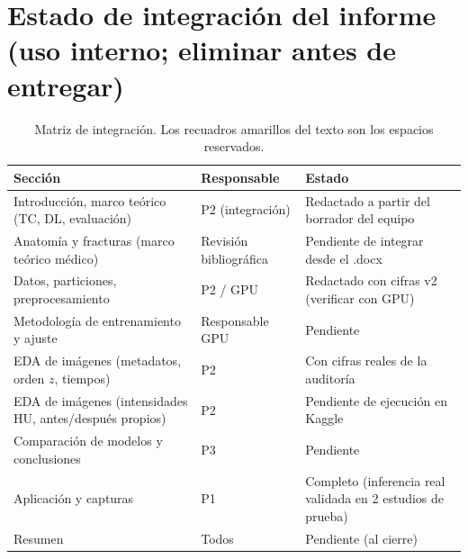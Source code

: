 \section{Estado de integraci\'on del informe (uso interno; eliminar antes de entregar)}
\begin{table}[H]\centering\small
\begin{tabular}{p{4.2cm}p{3.2cm}p{6.5cm}}\toprule
Secci\'on & Responsable & Estado \\\midrule
Introducci\'on, marco te\'orico (TC, DL, evaluaci\'on) & P2 (integraci\'on) & Redactado a partir del borrador del equipo \\
Anatom\'ia y fracturas (marco te\'orico m\'edico) & Revisi\'on bibliogr\'afica & Pendiente de integrar desde el .docx \\
Datos, particiones, preprocesamiento & P2 / GPU & Redactado con cifras v2 (verificar con GPU) \\
Metodolog\'ia de entrenamiento y ajuste & Responsable GPU & Pendiente \\
EDA de im\'agenes (metadatos, orden $z$, tiempos) & P2 & Con cifras reales de la auditor\'ia \\
EDA de im\'agenes (intensidades HU, antes/despu\'es propios) & P2 & Pendiente de ejecuci\'on en Kaggle \\
Comparaci\'on de modelos y conclusiones & P3 & Pendiente \\
Aplicaci\'on y capturas & P1 & Completo (inferencia real validada en 2 estudios de prueba) \\
Resumen & Todos & Pendiente (al cierre) \\\bottomrule
\end{tabular}
\caption{Matriz de integraci\'on. Los recuadros amarillos del texto son los espacios reservados.}
\end{table}
